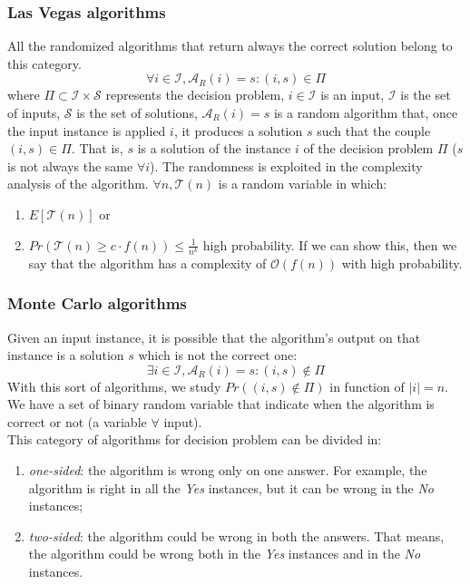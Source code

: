 \subsubsection*{Las Vegas algorithms}
All the randomized algorithms that return always the correct solution belong to this category.
\[
    \forall i \in \mathcal{I}, \mathcal{A}_{R}(i) = s:(i,s) \in \Pi
\]
\noindent
where $\Pi \subset \mathcal{I} \times \mathcal{S}$ represents the decision problem, $i \in \mathcal{I}$ is an input, $\mathcal{I}$ is the set of inputs, $\mathcal{S}$ is the set of solutions, $\mathcal{A}_{R}(i) = s$ is a random algorithm that, once the input instance is applied $i$, it produces a solution $s$ such that the couple $(i,s) \in \Pi$. That is, $s$ is a solution of the instance $i$ of the decision problem $\Pi$ ($s$ is not always the same $\forall i$). The randomness is exploited in the complexity analysis of the algorithm. $\forall n, \mathcal{T}(n)$ is a random variable in which:
\begin{enumerate}
    \item $E[\mathcal{T}(n)]$ or
    \item $Pr(\mathcal{T}(n) \ge c \cdot f(n)) \le \frac{1}{n^k}$ 
    high probability. If we can show this, then we say that the algorithm has a complexity of $\mathcal{O}(f(n))$ with high probability.
\end{enumerate}

\subsubsection*{Monte Carlo algorithms}
Given an input instance, it is possible that the algorithm's output on that instance is a solution $s$ which is not the correct one:
\[
    \exists i \in \mathcal{I}, \mathcal{A}_{R}(i) = s:(i,s) \notin \Pi
\]
\noindent
With this sort of algorithms, we study $Pr((i,s) \notin \Pi)$ in function of $|i| = n$. We have a set of binary random variable that indicate when the algorithm is correct or not (a variable $\forall$ input). \\ \noindent
This category of algorithms for decision problem can be divided in:
\begin{enumerate}
    \item \textit{one-sided}: the algorithm is wrong only on one answer. For example, the algorithm is right in all the \textit{Yes} instances, but it can be wrong in the \textit{No} instances;
    \item \textit{two-sided}: the algorithm could be wrong in both the answers. That means, the algorithm could be wrong both in the \textit{Yes} instances and in the \textit{No} instances.
\end{enumerate}